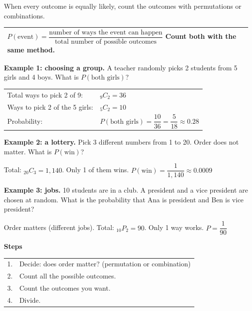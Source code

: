 \documentclass[11pt]{article}
\begin{document}

When every outcome is equally likely, count the outcomes with permutations or combinations.

\vspace{0.3em}
\renewcommand{\arraystretch}{1.3}
\begin{tabular}{|>{\raggedright\arraybackslash}p{6.7in}|}\hline
\rule{0pt}{2.4em}$P(\text{event}) = \dfrac{\text{number of ways the event can happen}}{\text{total number of possible outcomes}}$ \qquad Count both with the same method.\\[1em] \hline
\end{tabular}

\vspace{0.8em}
\textbf{Example 1: choosing a group.} A teacher randomly picks 2 students from 5 girls and 4 boys. What is $P(\text{both girls})$?

\vspace{0.4em}
\begin{tabular}{@{}ll}
Total ways to pick 2 of 9: & ${}_9C_2 = 36$\\
Ways to pick 2 of the 5 girls: & ${}_5C_2 = 10$\\[0.3em]
Probability: & $P(\text{both girls}) = \dfrac{10}{36} = \dfrac{5}{18} \approx 0.28$\\
\end{tabular}

\vspace{0.8em}
\textbf{Example 2: a lottery.} Pick 3 different numbers from 1 to 20. Order does not matter. What is $P(\text{win})$?

\vspace{0.3em}
Total: ${}_{20}C_3 = 1{,}140$. \; Only 1 of them wins. \quad $P(\text{win}) = \dfrac{1}{1{,}140} \approx 0.0009$

\vspace{0.8em}
\textbf{Example 3: jobs.} 10 students are in a club. A president and a vice president are chosen at random.
What is the probability that Ana is president and Ben is vice president?

\vspace{0.3em}
Order matters (different jobs). Total: ${}_{10}P_2 = 90$. \; Only 1 way works. \quad $P = \dfrac{1}{90}$

\vspace{0.8em}
\textbf{Steps}

\vspace{0.2em}
\begin{tabular}{@{}ll}
1. & Decide: does order matter? (permutation or combination)\\
2. & Count all the possible outcomes.\\
3. & Count the outcomes you want.\\
4. & Divide.\\
\end{tabular}
\end{document}
